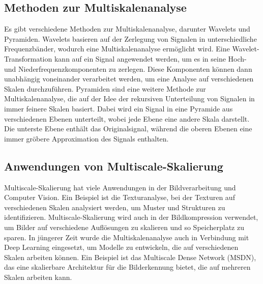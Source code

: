     \subsection{Methoden zur Multiskalenanalyse}
        Es gibt verschiedene Methoden zur Multiskalenanalyse, darunter Wavelets und Pyramiden.      
        Wavelets basieren auf der Zerlegung von Signalen in unterschiedliche Frequenzbänder, wodurch eine Multiskalenanalyse ermöglicht wird.      
        Eine Wavelet-Transformation kann auf ein Signal angewendet werden, um es in seine Hoch- und Niederfrequenzkomponenten zu zerlegen.      
        Diese Komponenten können dann unabhängig voneinander verarbeitet werden, um eine Analyse auf verschiedenen Skalen durchzuführen.
        Pyramiden sind eine weitere Methode zur Multiskalenanalyse, die auf der Idee der rekursiven Unterteilung von Signalen in immer feinere Skalen basiert.      Dabei wird ein Signal in eine Pyramide aus verschiedenen Ebenen unterteilt, wobei jede Ebene eine andere Skala darstellt.      
        Die unterste Ebene enthält das Originalsignal, während die oberen Ebenen eine immer gröbere Approximation des Signals enthalten.
    
    \subsection{Anwendungen von Multiscale-Skalierung}
        Multiscale-Skalierung hat viele Anwendungen in der Bildverarbeitung und Computer Vision.
        Ein Beispiel ist die Texturanalyse, bei der Texturen auf verschiedenen Skalen analysiert werden, um Muster und Strukturen zu identifizieren.      
        Multiscale-Skalierung wird auch in der Bildkompression verwendet, um Bilder auf verschiedene Auflösungen zu skalieren und so Speicherplatz zu sparen.
        In jüngerer Zeit wurde die Multiskalenanalyse auch in Verbindung mit Deep Learning eingesetzt, um Modelle zu entwickeln, die auf verschiedenen Skalen arbeiten können.      
        Ein Beispiel ist das Multiscale Dense Network (MSDN), das eine skalierbare Architektur für die Bilderkennung bietet, die auf mehreren Skalen arbeiten kann.
    
